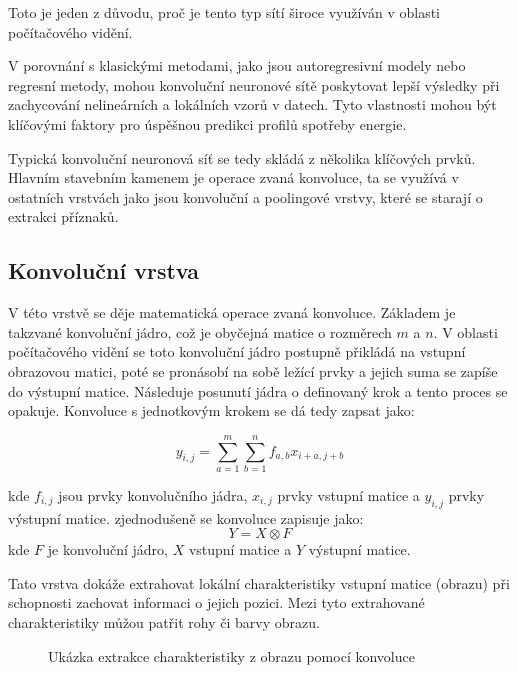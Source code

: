\documentclass[FM,BP,fonts]{tulthesis}
\begin{document}
Toto je jeden z důvodu, proč je tento typ sítí široce využíván v oblasti počítačového vidění. \cite{Yamashita2018}

V porovnání s klasickými metodami, jako jsou autoregresivní modely nebo regresní metody, mohou konvoluční neuronové sítě poskytovat lepší výsledky při zachycování nelineárních a lokálních vzorů v datech. Tyto vlastnosti mohou být klíčovými faktory pro úspěšnou predikci profilů spotřeby energie.

Typická konvoluční neuronová síť se tedy skládá z několika klíčových prvků. Hlavním stavebním kamenem je operace zvaná konvoluce, ta se využívá v ostatních vrstvách jako jsou konvoluční a poolingové vrstvy, které se starají o extrakci příznaků.

\subsection{Konvoluční vrstva}
V této vrstvě se děje matematická operace zvaná konvoluce. Základem je takzvané konvoluční jádro, což je obyčejná matice o rozměrech $m$ a $n$. V oblasti počítačového vidění se toto konvoluční jádro postupně přikládá na vstupní obrazovou matici, poté se pronásobí na sobě ležící prvky a jejich suma se zapíše do výstupní matice. Následuje posunutí jádra o definovaný krok a tento proces se opakuje. Konvoluce s jednotkovým krokem se dá tedy zapsat jako:

\begin{equation}
    y_{i,j} = \sum_{a = 1}^{m} \sum_{b = 1}^{n} f_{a,b}x_{i+a,j+b}
\end{equation}

kde $f_{i,j}$ jsou prvky konvolučního jádra, $x_{i,j}$ prvky vstupní matice a $y_{i,j}$ prvky výstupní matice. zjednodušeně se konvoluce zapisuje jako:
\begin{equation}
    Y = X \otimes F
\end{equation}
kde $F$ je konvoluční jádro, $X$ vstupní matice a $Y$ výstupní matice.

Tato vrstva dokáže extrahovat lokální charakteristiky vstupní matice (obrazu) při schopnosti zachovat informaci o jejich pozici. Mezi tyto extrahované charakteristiky můžou patřit rohy či barvy obrazu.\cite{vojtechJaros}


\begin{figure}[htbp]
	\centering
	\caption{Ukázka extrakce charakteristiky z obrazu pomocí konvoluce }
	\label{fig:nezamestnanost}
\end{figure}
\end{document}
